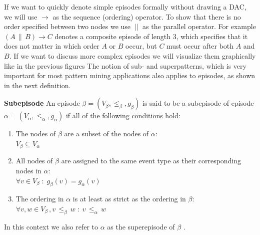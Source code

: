If we want to quickly denote simple episodes formally without drawing a DAC, we will use $\rightarrow$ as the sequence (ordering) operator. To show that there is no order specified between two nodes we use $\|$ as the parallel operator. For example $(A \, \| \, B ) \rightarrow C$ denotes a composite episode of length 3, which specifies that it does not matter in which order $A$ or $B$ occur, but $C$ must occur after both $A$ and $B$. If we want to discuss more complex episodes we will visualize them graphically like in the previous figures \newline  
The notion of sub- and superpatterns, which is very important for most pattern mining applications also applies to episodes, as shown in the next definition.

\begin{mydef}
\label{def_subEpisode}
\textbf{Subepisode} An episode $\beta = (V_\beta,{\leq}_{\beta},g_\beta)$ is said to be a subepisode of episode $\alpha = (V_\alpha,{\leq}_{\alpha},g_\alpha)$ if all of the following conditions hold:
\begin{enumerate}
	\item The nodes of $\beta$ are a subset of the nodes of $\alpha$: \\
	$V_\beta \subseteq V_\alpha$
	\item All nodes of $\beta$ are assigned to the same event type as their corresponding nodes in $\alpha$:\\
	 $\forall v \in V_\beta \; : \; g_{\beta}(v) = g_\alpha (v) $
	\item The ordering in $\alpha$ is at least as strict as the ordering in $\beta$:\\
	$\forall v,w \in V_\beta \, , v \, {\leq}_{\beta} \, w \; : \; v \, {\leq}_{\alpha} \, w$
\end{enumerate}
In this context we also refer to $\alpha$ as the superepisode of $\beta$ \cite{mannila1995discovering} \cite{laxman2007fast}.
\end{mydef}

